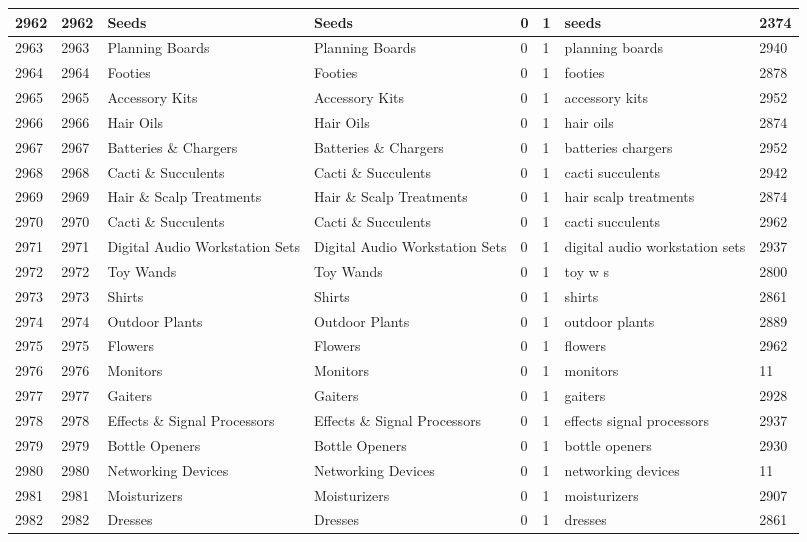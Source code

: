 \begin{longtable}{|l|l|l|l|l|l|l|l|}
2962 & 2962 & Seeds & Seeds & 0 & 1 & seeds & 2374 \\ \hline 
2963 & 2963 & Planning Boards & Planning Boards & 0 & 1 & planning boards & 2940 \\ \hline 
2964 & 2964 & Footies & Footies & 0 & 1 & footies & 2878 \\ \hline 
2965 & 2965 & Accessory Kits & Accessory Kits & 0 & 1 & accessory kits & 2952 \\ \hline 
2966 & 2966 & Hair Oils & Hair Oils & 0 & 1 & hair oils & 2874 \\ \hline 
2967 & 2967 & Batteries \& Chargers & Batteries \& Chargers & 0 & 1 & batteries chargers & 2952 \\ \hline 
2968 & 2968 & Cacti \& Succulents & Cacti \& Succulents & 0 & 1 & cacti succulents & 2942 \\ \hline 
2969 & 2969 & Hair \& Scalp Treatments & Hair \& Scalp Treatments & 0 & 1 & hair scalp treatments & 2874 \\ \hline 
2970 & 2970 & Cacti \& Succulents & Cacti \& Succulents & 0 & 1 & cacti succulents & 2962 \\ \hline 
2971 & 2971 & Digital Audio Workstation Sets & Digital Audio Workstation Sets & 0 & 1 & digital audio workstation sets & 2937 \\ \hline 
2972 & 2972 & Toy Wands & Toy Wands & 0 & 1 & toy w s & 2800 \\ \hline 
2973 & 2973 & Shirts & Shirts & 0 & 1 & shirts & 2861 \\ \hline 
2974 & 2974 & Outdoor Plants & Outdoor Plants & 0 & 1 & outdoor plants & 2889 \\ \hline 
2975 & 2975 & Flowers & Flowers & 0 & 1 & flowers & 2962 \\ \hline 
2976 & 2976 & Monitors & Monitors & 0 & 1 & monitors & 11 \\ \hline 
2977 & 2977 & Gaiters & Gaiters & 0 & 1 & gaiters & 2928 \\ \hline 
2978 & 2978 & Effects \& Signal Processors & Effects \& Signal Processors & 0 & 1 & effects signal processors & 2937 \\ \hline 
2979 & 2979 & Bottle Openers & Bottle Openers & 0 & 1 & bottle openers & 2930 \\ \hline 
2980 & 2980 & Networking Devices & Networking Devices & 0 & 1 & networking devices & 11 \\ \hline 
2981 & 2981 & Moisturizers & Moisturizers & 0 & 1 & moisturizers & 2907 \\ \hline 
2982 & 2982 & Dresses & Dresses & 0 & 1 & dresses & 2861 \\ \hline 

\end{longtable}
